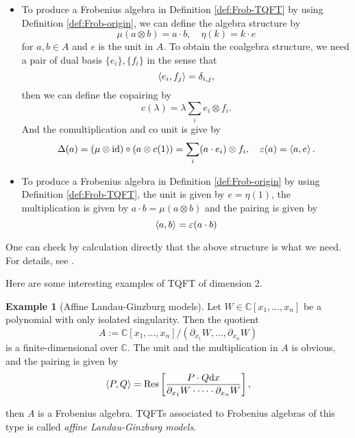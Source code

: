 \documentclass[10pt,reqno,final]{article}
\numberwithin{equation}{section}
\numberwithin{figure}{section}
\numberwithin{table}{section}
\theoremstyle{plain}
\theoremstyle{definition}
\newtheorem{example}[theorem]{Example}
\theoremstyle{remark}
\begin{document}
    \begin{itemize}
        \item To produce a Frobenius algebra in Definition \ref{def:Frob-TQFT} by using Definition \ref{def:Frob-origin}, we can define the algebra structure by 
        \[
          \mu(a\otimes b )= a\cdot b, \quad \eta(k )=k\cdot e
        \]
        for \(a,b \in A \) and \(e \) is the unit in \(A\). To obtain the coalgebra structure, we need a pair of dual basis \(\{ e_{i} \},\{ f_i \}\) in the sense that
        \[
          \braket{e_i,f_j}=\delta_{i,j}, 
        \]
        then we can define the copairing by
        \begin{equation}
          c(\lambda)=\lambda\sum_{i}e_i\otimes f_i.
        \end{equation}
        And the comultiplication and co unit is give by
        \begin{equation}
          \Delta(a)=(\mu\otimes \mathrm{id})\circ(a\otimes c(1))=\sum_{i}(a\cdot e_i)\otimes f_i,\quad \varepsilon(a )=\braket{a,e} .
        \end{equation}
        \item To produce a Frobenius algebra in Definition \ref{def:Frob-origin} by using Definition \ref{def:Frob-TQFT}, the unit is given by \(e=\eta(1)\), the multiplication is given by \(a\cdot b=\mu(a\otimes b)\) and the pairing is given by 
        \begin{equation}
          \braket{a,b} =\varepsilon(a\cdot b)
        \end{equation}
    \end{itemize}
    One can check by calculation directly that the above structure is what we need. For details, see \cite[Chapter 2]{kockFrobeniusAlgebras2d2004}. 

    Here are some interesting examples of TQFT of dimension 2. 
    
    \begin{example}[Affine Landau-Ginzburg models]
      Let \(W\in \mathbb{C}[x_1,\ldots ,x_{n}]\) be a polynomial with only isolated singularity. Then the quotient 
      \begin{equation}
        A:=\mathbb{C}[x_1,\ldots,x_n ]/(\partial_{x_1}W,\dots,\partial_{x_n}W)
      \end{equation}
      is a finite-dimensional over \(\mathbb{C}\). The unit and the multiplication in \(A\) is obvious, and the pairing is given by 
      \begin{equation}
        \braket{P,Q} =\mathrm{Res}\left[ \frac{P\cdot Q \mathrm{d}x}{\partial_{x_1}W\cdot \cdots\cdot \partial_{x_n}W } \right] ,
      \end{equation}
    \end{example}
    then \(A\) is a Frobenius algebra. TQFTs associated to Frobenius algebras of this type is called \emph{affine Landau-Ginzburg models}\cite{vafaTOPOLOGICALLANDAUGINZBURGMODELS1991,herbstLocalizationTracesOpenclosed2005,carquevilleAdjunctionsDefectsLandau2016}. 
\end{document}
